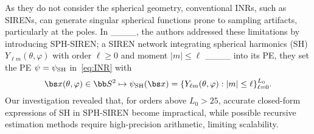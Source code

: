 As they do not consider the spherical geometry, conventional INRs, such as SIRENs, can generate singular spherical functions prone to sampling artifacts, particularly at the poles. In ____, the authors addressed these limitations by introducing SPH-SIREN; a SIREN network integrating spherical harmonics (SH) $Y_{\ell m}(\theta,\varphi)$ with order $\ell \geq 0$ and moment $|m|\leq \ell$ ____ into its PE, \ie they set the PE $\psi = \psi_{\rm SH}$ in~\eqref{eq:INR} with
\begin{equation*}
\bs x(\theta, \varphi)\in \bb S^2 \mapsto \psi_{\rm SH}(\bs x) = \{ {Y}_{\ell m}(\theta, \varphi) : |m|\leq \ell\}_{\ell=0}^{L_0}.
\end{equation*}
Our investigation revealed that, for orders above $L_0>25$, accurate closed-form expressions of SH in SPH-SIREN become impractical, while possible recursive estimation methods require high-precision arithmetic, limiting scalability.
